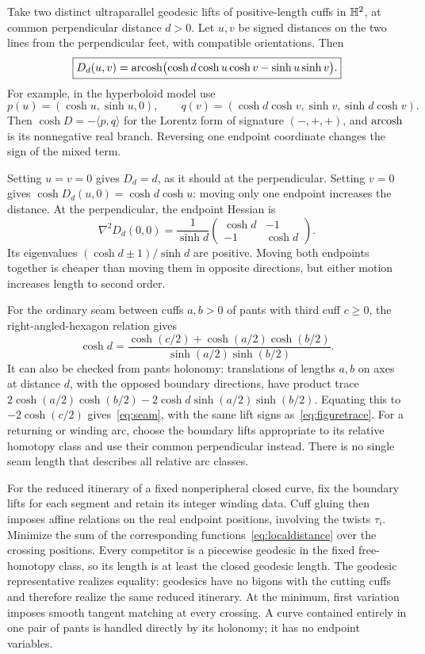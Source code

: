 Take two distinct ultraparallel geodesic lifts of positive-length cuffs
in $\mathbb H^2$, at common perpendicular distance $d>0$.
Let $u,v$ be signed distances on the two lines
from the perpendicular feet, with compatible orientations. Then
\begin{equation}
 \boxed{
 D_d(u,v)=\operatorname{arcosh}\bigl(\cosh d\cosh u\cosh v-\sinh u\sinh v\bigr).}
 \label{eq:localdistance}
\end{equation}
For example, in the hyperboloid model use
\[
 p(u)=(\cosh u,\sinh u,0),\qquad
 q(v)=(\cosh d\cosh v,\sinh v,\sinh d\cosh v).
\]
Then $\cosh D=-\langle p,q\rangle$ for the Lorentz form of signature
$(-,+,+)$, and $\operatorname{arcosh}$ is its nonnegative real branch.
Reversing one endpoint coordinate changes the sign of the mixed term.

Setting $u=v=0$ gives $D_d=d$, as it should at the perpendicular.
Setting $v=0$ gives $\cosh D_d(u,0)=\cosh d\cosh u$:
moving only one endpoint increases the distance. At the
perpendicular, the endpoint Hessian is
\[
 \nabla^2D_d(0,0)=\frac1{\sinh d}
     \begin{pmatrix}\cosh d&-1\\-1&\cosh d\end{pmatrix}.
\]
Its eigenvalues $(\cosh d\pm1)/\sinh d$ are positive. Moving
both endpoints together is cheaper than moving them in opposite
directions, but either motion increases length to second order.

For the ordinary seam between cuffs $a,b>0$ of pants with third cuff
$c\geq0$, the right-angled-hexagon relation gives
\begin{equation}
 \cosh d=\frac{\cosh(c/2)+\cosh(a/2)\cosh(b/2)}
                    {\sinh(a/2)\sinh(b/2)}.
 \label{eq:seam}
\end{equation}
It can also be checked from pants holonomy: translations of lengths
$a,b$ on axes at distance $d$, with the opposed boundary directions,
have product trace
$2\cosh(a/2)\cosh(b/2)-2\cosh d\sinh(a/2)\sinh(b/2)$.
Equating this to $-2\cosh(c/2)$ gives~\eqref{eq:seam}, with the
same lift signs as~\eqref{eq:figuretrace}.
For a returning or winding arc, choose the boundary lifts appropriate to
its relative homotopy class and use their common perpendicular instead.
There is no single seam length that describes all relative arc classes.

For the reduced itinerary of a fixed nonperipheral closed curve, fix the
boundary lifts for each segment and retain its integer winding data.
Cuff gluing then imposes affine relations on the real endpoint positions,
involving the twists $\tau_i$. Minimize the sum of the corresponding
functions~\eqref{eq:localdistance} over the crossing positions. Every
competitor is a piecewise geodesic in the fixed free-homotopy class, so its
length is at least the closed geodesic length. The geodesic representative
realizes equality: geodesics have no bigons with the cutting cuffs and
therefore realize the same reduced itinerary. At the minimum, first
variation imposes smooth tangent matching at every crossing. A curve
contained entirely in one pair of pants is handled directly by its
holonomy; it has no endpoint variables.

